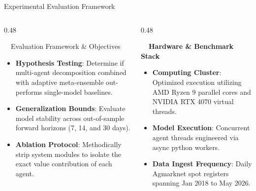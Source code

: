 \documentclass{beamer}
\begin{document}
\begin{frame}{Experimental Evaluation Framework}
\vspace{-0.2cm}

\begin{columns}[T]
    \begin{column}{0.48\textwidth}
        \begin{infocard}{~~Evaluation Framework \& Objectives}
            \fontsize{6.8pt}{8.5pt}\selectfont
            \begin{itemize}\setlength\itemsep{4.5pt}\setlength\parskip{0pt}
                \item \textbf{Hypothesis Testing}: Determine if multi-agent decomposition combined with adaptive meta-ensemble out-performs single-model baselines.
                \item \textbf{Generalization Bounds}: Evaluate model stability across out-of-sample forward horizons (7, 14, and 30 days).
                \item \textbf{Ablation Protocol}: Methodically strip system modules to isolate the exact value contribution of each agent.
            \end{itemize}
        \end{infocard}
    \end{column}
    
    \begin{column}{0.48\textwidth}
        \begin{smallcard}[0.98\textwidth, top=3pt, bottom=3pt, left=4pt, right=4pt, boxsep=0.5pt]
            \centering \textbf{\textcolor{primaryDark}{\small {}~~Hardware \& Benchmark Stack}}
            \vspace{0.08cm}
            \fontsize{6.8pt}{8.2pt}\selectfont
            \begin{itemize}\setlength\itemsep{4.5pt}\setlength\parskip{0pt}
                \item \textbf{Computing Cluster}: Optimized execution utilizing AMD Ryzen 9 parallel cores and NVIDIA RTX 4070 virtual threads.
                \item \textbf{Model Execution}: Concurrent agent threads engineered via async python workers.
                \item \textbf{Data Ingest Frequency}: Daily Agmarknet spot registers spanning Jan 2018 to May 2026.
            \end{itemize}
        \end{smallcard}
    \end{column}
\end{columns}


\end{frame}
\end{document}
